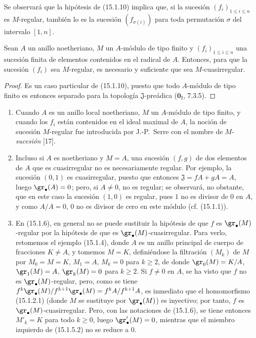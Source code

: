 Se observará que la hipótesis de (15.1.10) implica que, si la sucesión
$(f_i)_{1\leq i\leq n}$ es $M$-regular, también lo es la sucesión
$(f_{\sigma(i)})$ para toda permutación $\sigma$ del intervalo $[1,n]$.

\begin{corollary}[15.1.11]
\label{0.15.1.11-fr}
Sean $A$ un anillo noetheriano, $M$ un $A$-módulo de tipo finito y
$(f_i)_{1\leq i\leq n}$ una sucesión finita de elementos contenidos en el
\textup{radical} de $A$. Entonces, para que la sucesión $(f_i)$ sea $M$-regular, es
necesario y suficiente que sea $M$-cuasirregular.
\end{corollary}

\begin{proof}
Es un caso particular de (15.1.10), puesto que todo $A$-módulo de tipo finito
es entonces separado para la topología $\mathfrak{J}$-preádica
($\mathbf{0}_{\mathrm I}$, 7.3.5).
\end{proof}

\begin{remarks}[15.1.12]
\label{0.15.1.12-fr}
\mbox{}
\begin{enumerate}
  \item[(i)] Cuando $A$ es un anillo local noetheriano, $M$ un $A$-módulo de
  tipo finito, y cuando los $f_i$ están contenidos en el ideal maximal de $A$,
  la noción de sucesión $M$-regular fue introducida por J.-P.~Serre con el
  nombre de $M$-\emph{sucesión} [17].
  \item[(ii)] Incluso si $A$ es noetheriano y $M=A$, una sucesión $(f,g)$ de
  dos elementos de $A$ que es cuasirregular no es necesariamente regular. Por
  ejemplo, la sucesión $(0,1)$ es cuasirregular, puesto que entonces
  $\mathfrak{J}=fA+gA=A$, luego $\gr_\bullet(A)=0$; pero, si $A\neq0$, no es
  regular; se observará, no obstante, que en este caso la sucesión $(1,0)$ es
  regular, pues $1$ no es divisor de $0$ en $A$, y como $A/A=0$, $0$ no es
  divisor de cero en este módulo (cf. (15.1.1)).
  \item[(iii)]
  En (15.1.6), en general no se puede sustituir la hipótesis de que $f$ es
  $\gr_\bullet(M)$-regular por la hipótesis de que es
  $\gr_\bullet(M)$-cuasirregular. Para verlo, retomemos el ejemplo (15.1.4),
  donde $A$ es un anillo principal de cuerpo de fracciones $K\neq A$, y
  tomemos $M=K$, definiéndose la filtración $(M_k)$ de $M$ por
  $M_0=M=K$, $M_1=A$, $M_k=0$ para $k\geq2$, de donde
  $\gr_0(M)=K/A$, $\gr_1(M)=A$, $\gr_k(M)=0$ para $k\geq2$. Si $f\neq0$ en
  $A$, se ha visto que $f$ no es $\gr_\bullet(M)$-regular, pero, como se tiene
  $f^k\gr_\bullet(M)/f^{k+1}\gr_\bullet(M)=f^kA/f^{k+1}A$,
  es inmediato que el homomorfismo (15.1.2.1) (donde $M$ se sustituye por
  $\gr_\bullet(M)$) es inyectivo; por tanto, $f$ es
  $\gr_\bullet(M)$-cuasirregular. Pero, con las notaciones de (15.1.6), se
  tiene entonces $M'_k=K$ para todo $k\geq0$, luego
  $\gr'_\bullet(M)=0$, mientras que el miembro izquierdo de (15.1.5.2) no se
  reduce a $0$.
\end{enumerate}
\end{remarks}

